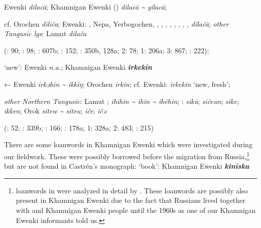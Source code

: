 \documentclass[output=paper,colorlinks,citecolor=brown]{langscibook}
\begin{document}
    \ex {} Ewenki \textit{dilacā}; Khamnigan Ewenki () \textit{dilacā {\textasciitilde} gilacā};

    cf. Orochen \textit{diliča};  Ewenki: , Nepa, Yerbogochen, , , , , , , , ,  \textit{dïlačā}; \textit{other Tungusic lgs}: Lamut \textit{dilača}
    
    (\citealt{Castrén1856}: 90; \citealt{Janhunen1991}: 98; \citealt{Dorji1998}: 607b; \citealt{Chaoke2014a}: 152; \citealt{Vasilevic1958}: 350b, 128a; \citealt{Cincius1975B} 2: 78; 1: 206a; \citealt{Hauer1952} 3: 867; \citealt{Zikmundová2013a}: 222);
\z

    \ex ‘new’:  Ewenki \textit{n.a.}; Khamnigan Ewenki \textbf{\textit{irkekīn}}

    ←  Ewenki \textit{irkǝhin {\textasciitilde} ikkiŋ}; Orochen \textit{irkin}; cf.  Ewenki:  \textit{irkekīn} ‘new, fresh’;

    \textit{other Northern Tungusic}: Lamut ;  \textit{ihihīn {\textasciitilde} īhin {\textasciitilde} ihēhin}; \textit{}:  \textit{sikū};  \textit{sičeun};  \textit{sike};  \textit{ikken}; Orok \textit{sitew {\textasciitilde} siteu};  \textit{iče};  \textit{ičǝ} 
    
    (\citealt{Janhunen1991}: 52; \citealt{Dorji1998}: 339b; \citealt{Chaoke2014a}: 166; \citealt{Vasilevic1958}: 178a; \citealt{Cincius1975B} 1: 328a; \citealt{Hauer1952} 2: 483; \citealt{Zikmundová2013a}: 215)
\z
\z


\ea
There are some  loanwords in Khamnigan Ewenki which were investigated during our fieldwork. These were possibly borrowed before the migration from Russia,\footnote{ loanwords in  were analyzed in detail by \citet{Gruntov2015}. These loanwords are possibly also present in Khamnigan Ewenki due to the fact that Russians lived together with  and Khamnigan Ewenki people until the 1960s as one of our Khamnigan Ewenki informants told us.} but are not found in Castrén’s monograph:
\ea ‘book’: Khamnigan Ewenki \textbf{\textit{kinīska}}
\end{document}
